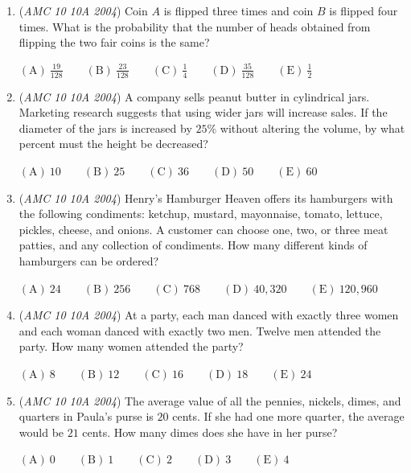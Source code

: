 \begin{enumerate}
$\mathrm{(A) \ } 2 \qquad \mathrm{(B) \ } 4 \qquad \mathrm{(C) \ } 5 \qquad \mathrm{(D) \ } 8 \qquad \mathrm{(E) \ } 9$


	\item (\textit{AMC 10 10A 2004}) Coin $A$ is flipped three times and coin $B$ is flipped four times.  What is the probability that the number of heads obtained from flipping the two fair coins is the same?


 $\mathrm{(A) \ } \frac{19}{128} \qquad \mathrm{(B) \ } \frac{23}{128} \qquad \mathrm{(C) \ } \frac14 \qquad \mathrm{(D) \ } \frac{35}{128} \qquad \mathrm{(E) \ } \frac12$


	\item (\textit{AMC 10 10A 2004}) A company sells peanut butter in cylindrical jars.  Marketing research suggests that using wider jars will increase sales.  If the diameter of the jars is increased by $25\%$ without altering the volume, by what percent must the height be decreased?


 $\mathrm{(A) \ } 10 \qquad \mathrm{(B) \ } 25 \qquad \mathrm{(C) \ } 36 \qquad \mathrm{(D) \ } 50 \qquad \mathrm{(E) \ } 60$


	\item (\textit{AMC 10 10A 2004}) Henry's Hamburger Heaven offers its hamburgers with the following condiments: ketchup, mustard, mayonnaise, tomato, lettuce, pickles, cheese, and onions.  A customer can choose one, two, or three meat patties, and any collection of condiments.  How many different kinds of hamburgers can be ordered?


 $\mathrm{(A) \ } 24 \qquad \mathrm{(B) \ } 256 \qquad \mathrm{(C) \ } 768 \qquad \mathrm{(D) \ } 40,320 \qquad \mathrm{(E) \ } 120,960$


	\item (\textit{AMC 10 10A 2004}) At a party, each man danced with exactly three women and each woman danced with exactly two men.  Twelve men attended the party.  How many women attended the party?


 $\mathrm{(A) \ } 8 \qquad \mathrm{(B) \ } 12 \qquad \mathrm{(C) \ } 16 \qquad \mathrm{(D) \ } 18 \qquad \mathrm{(E) \ } 24$


	\item (\textit{AMC 10 10A 2004}) The average value of all the pennies, nickels, dimes, and quarters in Paula's purse is $20$ cents.  If she had one more quarter, the average would be $21$ cents.  How many dimes does she have in her purse?


 $\mathrm{(A) \ } 0 \qquad \mathrm{(B) \ } 1 \qquad \mathrm{(C) \ } 2 \qquad \mathrm{(D) \ } 3 \qquad \mathrm{(E) \ } 4$



\end{enumerate}

